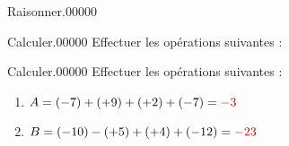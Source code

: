 \documentclass[a4paper,dvipsnames,french,10pt]{book}
\begin{document}
\begin{pageParcoursu}
\begin{ExoCuN}{Raisonner.}{0}{0}{0}{0}{0}
\begin{enumerate}
\end{enumerate}
\end{ExoCuN}

\begin{ExoCuN}{Calculer.}{0}{0}{0}{0}{0}
Effectuer les opérations suivantes :\vspace{.2cm}


\end{ExoCuN}

\begin{ExoCuN}{Calculer.}{0}{0}{0}{0}{0}
Effectuer les opérations suivantes :\vspace{.2cm}
\begin{enumerate}
\item $A=(-7)+(+9)+(+2)+(-7)=\textcolor{red}{-3}$\vspace{.2cm}
\item $B=(-10)-(+5)+(+4)+(-12)=\textcolor{red}{-23}$
\end{enumerate}
\end{ExoCuN}




\end{pageParcoursu}
\end{document}
